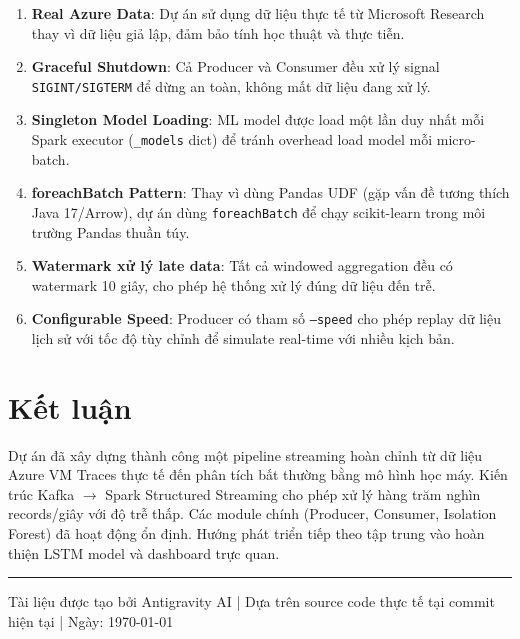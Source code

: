 \documentclass[12pt,a4paper]{article}
\begin{document}
\begin{enumerate}
  \item \textbf{Real Azure Data}: Dự án sử dụng dữ liệu thực tế từ Microsoft Research thay vì dữ liệu giả lập, đảm bảo tính học thuật và thực tiễn.

  \item \textbf{Graceful Shutdown}: Cả Producer và Consumer đều xử lý signal \texttt{SIGINT/SIGTERM} để dừng an toàn, không mất dữ liệu đang xử lý.

  \item \textbf{Singleton Model Loading}: ML model được load một lần duy nhất mỗi Spark executor (\texttt{\_models} dict) để tránh overhead load model mỗi micro-batch.

  \item \textbf{foreachBatch Pattern}: Thay vì dùng Pandas UDF (gặp vấn đề tương thích Java 17/Arrow), dự án dùng \texttt{foreachBatch} để chạy scikit-learn trong môi trường Pandas thuần túy.

  \item \textbf{Watermark xử lý late data}: Tất cả windowed aggregation đều có watermark 10 giây, cho phép hệ thống xử lý đúng dữ liệu đến trễ.

  \item \textbf{Configurable Speed}: Producer có tham số \texttt{--speed} cho phép replay dữ liệu lịch sử với tốc độ tùy chỉnh để simulate real-time với nhiều kịch bản.
\end{enumerate}

\section*{Kết luận}

Dự án đã xây dựng thành công một pipeline streaming hoàn chỉnh từ dữ liệu Azure VM Traces thực tế đến phân tích bất thường bằng mô hình học máy. Kiến trúc Kafka $\rightarrow$ Spark Structured Streaming cho phép xử lý hàng trăm nghìn records/giây với độ trễ thấp. Các module chính (Producer, Consumer, Isolation Forest) đã hoạt động ổn định. Hướng phát triển tiếp theo tập trung vào hoàn thiện LSTM model và dashboard trực quan.

\vspace{1cm}
\hrule
\vspace{0.3cm}
{\small\color{gray} Tài liệu được tạo bởi Antigravity AI | Dựa trên source code thực tế tại commit hiện tại | Ngày: \today}
\end{document}

